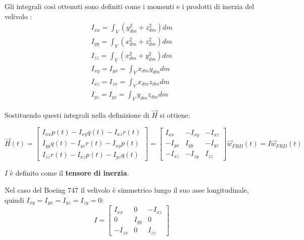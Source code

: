 Gli integrali così ottenuti sono definiti come i momenti e i prodotti di inerzia del velivolo \cite{smith_aircraft_flight_mechanics}:
\begin{equation*}
    \begin{split}
        I_{xx} = \int_V \left(y_{dm}^2 + z_{dm}^2\right) dm \\
        I_{yy} = \int_V \left(x_{dm}^2 + z_{dm}^2\right) dm \\
        I_{zz} = \int_V \left(x_{dm}^2 + y_{dm}^2\right) dm \\
        I_{xy} = I_{yx} = \int_V x_{dm}y_{dm} dm            \\
        I_{xz} = I_{zx} = \int_V x_{dm}z_{dm} dm            \\
        I_{yz} = I_{yz} = \int_V y_{dm}z_{dm} dm
    \end{split}
\end{equation*}

Sostituendo questi integrali nella definizione di $\vec{H}$ si ottiene:

\begin{equation*}
    \vec{H}(t) = \begin{bmatrix}
        I_{xx}p(t) - I_{xy}q(t) - I_{xz}r(t) \\
        I_{yy}q(t) - I_{yz}r(t) - I_{xy}p(t) \\
        I_{zz}r(t) - I_{xz}p(t) - I_{yz}q(t)
    \end{bmatrix} = \begin{bmatrix}
        I_{xx}   & - I_{xy} & - I_{xz} \\
        - I_{yx} & I_{yy}   & - I_{yz} \\
        - I_{xz} & - I_{zy} & I_{zz}
    \end{bmatrix} \vec{w}_{FRD}(t) = I \vec{w}_{FRD}(t)
\end{equation*}

\begin{note}
    $I$ è definito come il \textbf{tensore di inerzia}.
\end{note}

Nel caso del Boeing 747 il velivolo è simmetrico lungo il suo asse longitudinale, quindi $I_{xy}=I_{yx}=I_{yz}=I_{zy}=0$:
\begin{equation}
    \label{eq:TensoreInerzia}
    I = \begin{bmatrix}
        I_{xx}   & 0      & - I_{xz} \\
        0        & I_{yy} & 0        \\
        - I_{zx} & 0      & I_{zz}
    \end{bmatrix}
\end{equation}

